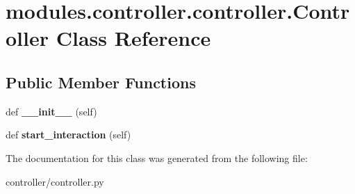 \hypertarget{classmodules_1_1controller_1_1controller_1_1_controller}{}\section{modules.\+controller.\+controller.\+Controller Class Reference}
\label{classmodules_1_1controller_1_1controller_1_1_controller}
\subsection*{Public Member Functions}
\begin{DoxyCompactItemize}
\item 
\mbox{\label{classmodules_1_1controller_1_1controller_1_1_controller_a4ab4d5d1e8434fa7400cb50a4189af8a}} 
def {\bfseries \+\_\+\+\_\+init\+\_\+\+\_\+} (self)
\item 
\mbox{\label{classmodules_1_1controller_1_1controller_1_1_controller_af444863da76a145a93b1ef6b66dcc5cf}} 
def {\bfseries start\+\_\+interaction} (self)
\end{DoxyCompactItemize}


The documentation for this class was generated from the following file\+:\begin{DoxyCompactItemize}
\item 
controller/controller.\+py\end{DoxyCompactItemize}
